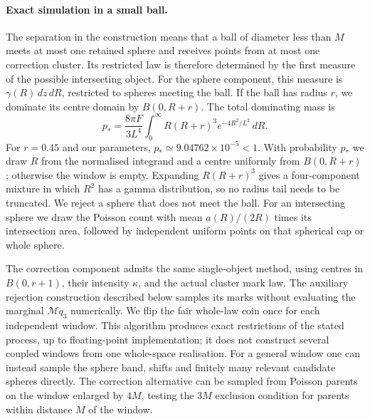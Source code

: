 \documentclass[11pt,a4paper]{article}
\numberwithin{equation}{section}
\theoremstyle{definition}
\theoremstyle{remark}
\begin{document}
\paragraph{Exact simulation in a small ball.}
The separation in the construction means that a ball of diameter less than
$M$ meets at most one retained sphere and receives points from at most one
correction cluster. Its restricted law is therefore determined by the
first measure of the possible intersecting object. For the sphere component,
this measure is $\gamma(R)\,dz\,dR$, restricted to spheres meeting the ball.
If the ball has radius $r$, we dominate its centre domain by $B(0,R+r)$.
The total dominating mass is
\[
 p_* = \frac{8\pi F}{3L^4}
        \int_0^\infty R(R+r)^3 e^{-4R^2/L^2}\,dR.
\]
For $r=0.45$ and our parameters, $p_*\simeq9.04762\times10^{-5}<1$.
With probability $p_*$ we draw $R$ from the normalised integrand and a
centre uniformly from $B(0,R+r)$; otherwise the window is empty. Expanding
$R(R+r)^3$ gives a four-component mixture in which $R^2$ has a gamma
distribution, so no radius tail needs to be truncated. We reject a sphere
that does not meet the ball. For an intersecting sphere we draw the
Poisson count with mean $a(R)/(2R)$ times its intersection area, followed
by independent uniform points on that spherical cap or whole sphere.

The correction component admits the same single-object method, using
centres in $B(0,r+1)$, their intensity $\kappa$, and the actual cluster
mark law. The auxiliary rejection construction described below samples its
marks without evaluating the marginal $\mathcal Mq_3$ numerically.
We flip the fair whole-law coin once for each independent window. This
algorithm produces exact restrictions of the stated process, up to
floating-point implementation; it does not construct several coupled
windows from one whole-space realisation. For a general window one can
instead sample the sphere band, shifts and finitely many relevant candidate
spheres directly. The correction alternative can be sampled from Poisson
parents on the window enlarged by $4M$, testing the $3M$ exclusion condition
for parents within distance $M$ of the window.
\end{document}
